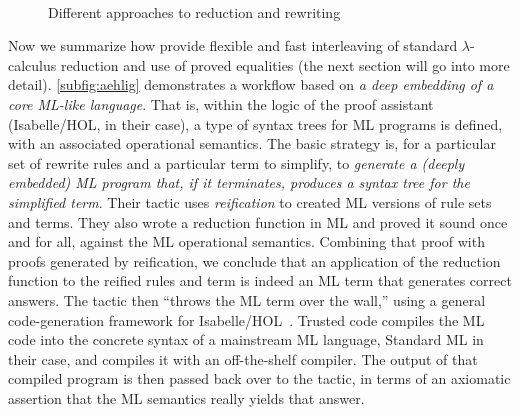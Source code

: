 \begin{figure}
{    \label{subfig:aehlig}} \\

  \caption{Different approaches to reduction and rewriting}
  \label{fig:trust}
\end{figure}

Now we summarize how \textcite{Aehlig} provide flexible and fast interleaving of standard $\lambda$-calculus reduction and use of proved equalities (the next section will go into more detail).
\autoref{subfig:aehlig} demonstrates a workflow based on \emph{a deep embedding of a core ML-like language}.
That is, within the logic of the proof assistant (Isabelle/HOL, in their case), a type of syntax trees for ML programs is defined, with an associated operational semantics.
The basic strategy is, for a particular set of rewrite rules and a particular term to simplify, to \emph{generate a (deeply embedded) ML program that, if it terminates, produces a syntax tree for the simplified term}.
Their tactic uses \emph{reification} to created ML versions of rule sets and terms.
They also wrote a reduction function in ML and proved it sound once and for all, against the ML operational semantics.
Combining that proof with proofs generated by reification, we conclude that an application of the reduction function to the reified rules and term is indeed an ML term that generates correct answers.
The tactic then ``throws the ML term over the wall,'' using a general code-generation framework for Isabelle/HOL~\cite{CodeGen}.
Trusted code compiles the ML code into the concrete syntax of a mainstream ML language, Standard ML in their case, and compiles it with an off-the-shelf compiler.
The output of that compiled program is then passed back over to the tactic, in terms of an axiomatic assertion that the ML semantics really yields that answer.

